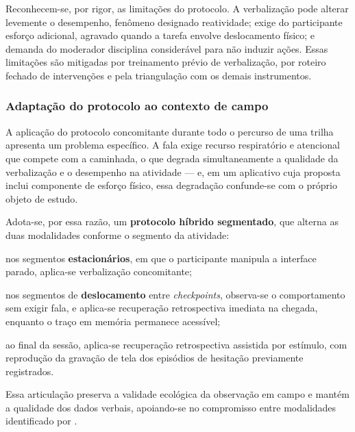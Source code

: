 Reconhecem-se, por rigor, as limitações do protocolo. A verbalização pode alterar
levemente o desempenho, fenômeno designado reatividade; exige do participante
esforço adicional, agravado quando a tarefa envolve deslocamento físico; e demanda
do moderador disciplina considerável para não induzir ações. Essas limitações são
mitigadas por treinamento prévio de verbalização, por roteiro fechado de
intervenções e pela triangulação com os demais instrumentos.

\subsubsection{Adaptação do protocolo ao contexto de campo}

A aplicação do protocolo concomitante durante todo o percurso de uma trilha
apresenta um problema específico. A fala exige recurso respiratório e atencional
que compete com a caminhada, o que degrada simultaneamente a qualidade da
verbalização e o desempenho na atividade --- e, em um aplicativo cuja proposta
inclui componente de esforço físico, essa degradação confunde-se com o próprio
objeto de estudo.

Adota-se, por essa razão, um \textbf{protocolo híbrido segmentado}, que alterna
as duas modalidades conforme o segmento da atividade:

\begin{alineas}
  \item nos segmentos \textbf{estacionários}, em que o participante manipula a
  interface parado, aplica-se verbalização concomitante;

  \item nos segmentos de \textbf{deslocamento} entre \textit{checkpoints},
  observa-se o comportamento sem exigir fala, e aplica-se recuperação
  retrospectiva imediata na chegada, enquanto o traço em memória permanece
  acessível;

  \item ao final da sessão, aplica-se recuperação retrospectiva assistida por
  estímulo, com reprodução da gravação de tela dos episódios de hesitação
  previamente registrados.
\end{alineas}

Essa articulação preserva a validade ecológica da observação em campo e mantém a
qualidade dos dados verbais, apoiando-se no compromisso entre modalidades
identificado por .

